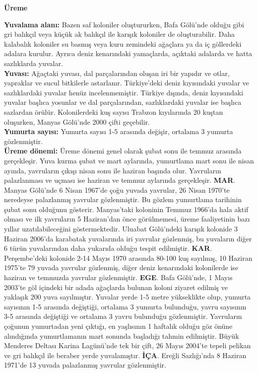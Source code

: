 \documentclass[
  a4paper,
  DIV=11,
  numbers=noendperiod]{scrreprt}
\begin{document}
\textbf{Üreme}

\textbf{Yuvalama alanı:} Bazen saf koloniler oluştururken, Bafa Gölü'nde
olduğu gibi gri balıkçıl veya küçük ak balıkçıl ile karışık koloniler de
oluşturabilir. Daha kalabalık koloniler su basmış veya kuru zemindeki
ağaçlara ya da iç göllerdeki adalara kurulur. Ayrıca deniz kenarındaki
yamaçlarda, açıktaki adalarda ve hatta sazlıklarda yuvalar.\\
\textbf{Yuvası:} Ağaçtaki yuvası, dal parçalarından oluşan iri bir
yapıdır ve otlar, yapraklar ve sucul bitkilerle astarlanır. Türkiye'deki
deniz kıyısındaki yuvalar ve sazlıklardaki yuvalar henüz
incelenmemiştir. Türkiye dışında, deniz kıyısındaki yuvalar başlıca
yosunlar ve dal parçalarından, sazlıklardaki yuvalar ise başlıca
sazlardan örülür. Kolonilerdeki kuş sayısı Trabzon kıyılarında 20 kuştan
oluşurken, Manyas Gölü'nde 2000 çifti geçebilir.\\
\textbf{Yumurta sayısı:} Yumurta sayısı 1-5 arasında değişir, ortalama 3
yumurta gözlenmiştir.\\
\textbf{Üreme dönemi:} Üreme dönemi genel olarak şubat sonu ile temmuz
arasında gerçekleşir. Yuva kurma şubat ve mart aylarında, yumurtlama
mart sonu ile nisan ayında, yavruların çıkışı nisan sonu ile haziran
başında olur. Yavruların palazlanması ve uçması ise haziran ve temmuz
aylarında gerçekleşir. \textbf{MAR}. Manyas Gölü'nde 6 Nisan 1967'de
çoğu yuvada yavrular, 26 Nisan 1970'te neredeyse palazlanmış yavrular
gözlenmiştir. Bu gözlem yumurtlama tarihinin şubat sonu olduğunu
gösterir. Manyas'taki koloninin Temmuz 1966'da hala aktif olması ve ilk
yavruların 5 Haziran'dan önce görülmemesi, üreme faaliyetinin bazı
yıllar uzatılabileceğini göstermektedir. Uluabat Gölü'ndeki karışık
kolonide 3 Haziran 2006'da karabatak yuvalarında iri yavrular gözlenmiş,
bu yuvaların diğer 6 türün yuvalarından daha yukarıda olduğu tespit
edilmiştir. \textbf{KAR}. Perşembe'deki kolonide 2-14 Mayıs 1970
arasında 80-100 kuş sayılmış, 10 Haziran 1975'te 79 yuvada yavrular
gözlenmiş, diğer deniz kenarındaki kolonilerde ise haziran ve temmuzda
yavrular gözlenmiştir. \textbf{EGE}. Bafa Gölü'nde, 1 Mayıs 2003'te göl
içindeki bir adada ağaçlarda bulunan koloni ziyaret edilmiş ve yaklaşık
200 yuva sayılmıştır. Yuvalar yerde 1-5 metre yükseklikte olup, yumurta
sayısının 1-5 arasında değiştiği, ortalama 3 yumurta bulunduğu, yavru
sayısının 3-5 arasında değiştiği ve ortalama 3 yavru bulunduğu
gözlenmiştir. Yavruların çoğunun yumurtadan yeni çıktığı, en yaşlısının
1 haftalık olduğu göz önüne alındığında yumurtlamanın mart sonunda
başladığı tahmin edilmiştir. Büyük Menderes Deltası Karina Lagünü'nde
tek bir çift, 26 Mayıs 2004'te tepeli pelikan ve gri balıkçıl ile
beraber yerde yuvalamıştır. \textbf{İÇA}. Ereğli Sazlığı'nda 8 Haziran
1971'de 13 yuvada palazlanmış yavrular gözlenmiştir.
\end{document}

